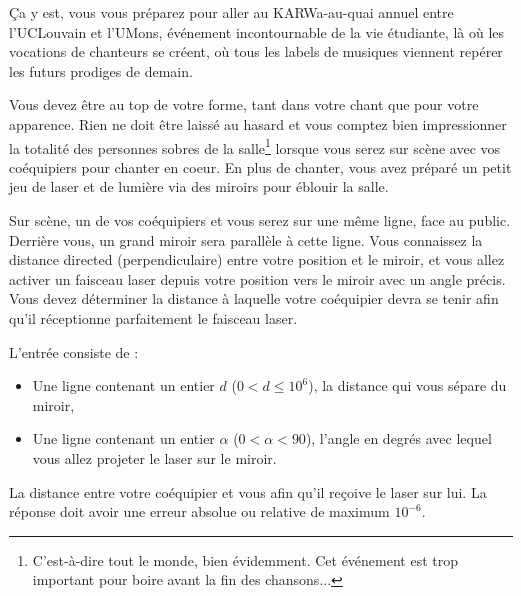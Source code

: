 \problemname{\problemyamlname}

Ça y est, vous vous préparez pour aller au KARWa-au-quai annuel entre l'UCLouvain et l'UMons, événement incontournable de la vie étudiante, là où les vocations de chanteurs se créent, où tous les labels de musiques viennent repérer les futurs prodiges de demain.

Vous devez être au top de votre forme, tant dans votre chant que pour votre apparence.
Rien ne doit être laissé au hasard et vous comptez bien impressionner la totalité des personnes sobres de la salle\footnote{C'est-à-dire tout le monde, bien évidemment. Cet événement est trop important pour boire avant la fin des chansons...} lorsque vous serez sur scène avec vos coéquipiers pour chanter en coeur.
En plus de chanter, vous avez préparé un petit jeu de laser et de lumière via des miroirs pour éblouir la salle.

Sur scène, un de vos coéquipiers et vous serez sur une même ligne, face au public.
Derrière vous, un grand miroir sera parallèle à cette ligne.
Vous connaissez la distance directed (perpendiculaire) entre votre position et le miroir, et vous allez activer un faisceau laser depuis votre position vers le miroir avec un angle précis.
Vous devez déterminer la distance à laquelle votre coéquipier devra se tenir afin qu'il réceptionne parfaitement le faisceau laser.

\begin{Input}
	L'entrée consiste de :
	\begin{itemize}
		\item Une ligne contenant un entier $d$ ($0 < d \le 10^6$), la distance qui vous sépare du miroir,
		\item Une ligne contenant un entier $\alpha$ ($0 < \alpha < 90$), l'angle en degrés avec lequel vous allez projeter le laser sur le miroir.
	\end{itemize}
\end{Input}

\begin{Output}
	La distance entre votre coéquipier et vous afin qu'il reçoive le laser sur lui.
	La réponse doit avoir une erreur absolue ou relative de maximum $10^{-6}$.
\end{Output}
